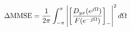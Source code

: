 \documentclass[preview]{standalone}
\begin{document}
\begin{align*}
\special{dvisvgm:raw <g id='unique000'>}\Delta\text{MMSE}=\frac{1}{2\pi}\int_{-\pi}^{\pi}\left|\left[\frac{D_{yx}(e^{j\Omega})}{F(e^{-j\Omega})}\right]_{-}\right|^2 d\Omega\special{dvisvgm:raw </g>}
\end{align*}
\end{document}
